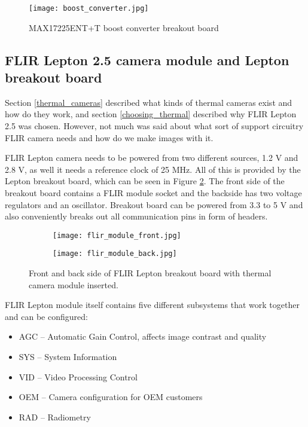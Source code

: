 \begin{figure}[ht]
        \centering
        \texttt{[image: boost\_converter.jpg]} 
        \caption{ MAX17225ENT+T boost converter breakout board}
        \label{boost_converter}
\end{figure}

\subsection{ FLIR Lepton 2.5 camera module and Lepton breakout board}

Section \ref{thermal_cameras} described what kinds of thermal cameras exist and how do they work, and section \ref{choosing_thermal} described why FLIR Lepton 2.5 was chosen.
However, not much was said about what sort of support circuitry FLIR camera needs and how do we make images with it.

FLIR Lepton camera needs to be powered from two different sources, 1.2 \si{\volt} and 2.8 \si{\volt}, as well it needs a reference clock of 25 \si{\mega\hertz}.
All of this is provided by the Lepton breakout board, which can be seen in Figure \ref{lepton_breakout}.
The front side of the breakout board contains a FLIR module socket and the backside has two voltage regulators and an oscillator.
Breakout board can be powered from 3.3 to 5 \si{\volt} and also conveniently breaks out all communication pins in form of headers.

\begin{figure}[ht] 
    \begin{subfigure}[b]{0.5\textwidth}
        \centering
        \texttt{[image: flir\_module\_front.jpg]} 
    \end{subfigure}
    \begin{subfigure}[b]{0.5\textwidth}
        \centering
        \texttt{[image: flir\_module\_back.jpg]} 
    \end{subfigure}
    \caption{ Front and back side of FLIR Lepton breakout board with thermal camera module inserted.}
    \label{lepton_breakout}
\end{figure}

FLIR Lepton module itself contains five different subsystems that work together and can be configured:

\begin{itemize}
    \item AGC – Automatic Gain Control, affects image contrast and quality
    \item SYS – System Information
    \item VID – Video Processing Control
    \item OEM – Camera configuration for OEM customers
    \item RAD – Radiometry
\end{itemize}

